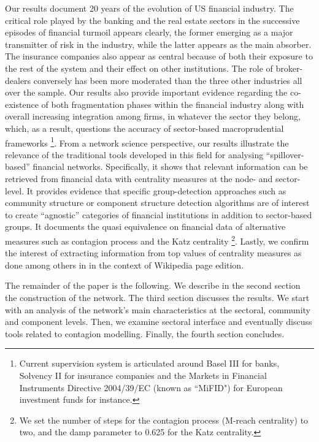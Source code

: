 \documentclass[a4paper,10pt]{article}
\begin{document}
Our results document  20 years of the evolution of US financial industry. The critical role played by the banking  and the 
real estate sectors in the successive episodes of financial turmoil appears clearly, the former emerging as a major 
transmitter of risk in the industry, while the latter appears as the main absorber. The insurance companies also appear as
central because of both their exposure to the rest of the system and their effect on other institutions. The role of 
broker-dealers conversely has been  more moderated than the three other industries all over the sample. Our results also 
provide important evidence regarding the co-existence of both fragmentation phases within the financial industry along with
overall increasing integration among firms, in whatever the sector they belong, which, as a result, questions the accuracy of 
sector-based macroprudential frameworks \footnote{Current supervision system is articulated around Basel III for banks, 
Solvency II for insurance companies and the Markets in Financial Instruments Directive 2004/39/EC (known as ``MiFID") for 
European investment funds for instance.}.
From a network science perspective, our results illustrate the relevance of the traditional tools developed in this field for
analysing “spillover-based” financial networks. Specifically, it shows that relevant information can be retrieved from 
financial data with centrality measures at the node- and sector-level. It provides evidence that specific group-detection 
approaches such as community structure or component structure detection algorithms are of interest to create “agnostic” 
categories of financial institutions in addition to sector-based groups. It documents the quasi equivalence on financial 
data of alternative measures such as contagion process and the Katz centrality \footnote{We set the number of steps for the 
contagion process (M-reach centrality) to two, and the damp parameter to 0.625 for the Katz centrality.}. Lastly, we confirm 
the interest of extracting information from top values of centrality measures as done among others in \cite{Gandica} in the context of 
Wikipedia page edition. 

The remainder of the paper is the following. We describe in the second section the construction of the network. The third 
section discusses the results. We start with an analysis of the network’s main characteristics at the sectoral, community and 
component levels. Then, we examine sectoral interface and eventually discuss tools related to contagion modelling. Finally,
the fourth section concludes.
\end{document}
